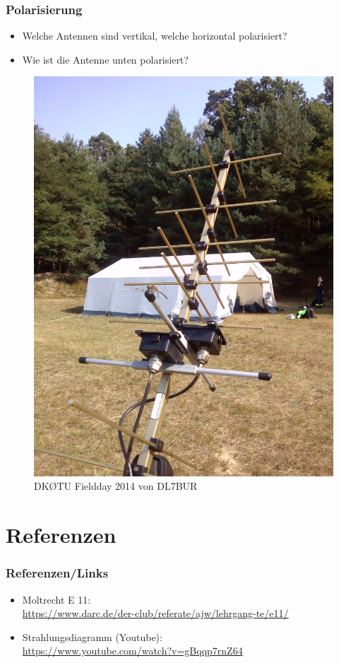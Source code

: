 \begin{frame}
  \frametitle{Polarisierung}
  \begin{itemize}
    \item Welche Antennen sind vertikal, welche horizontal polarisiert?
    \item Wie ist die Antenne unten polarisiert?
  \end{itemize}
  \begin{center}
    \begin{figure}
      \includegraphics[width=.3\textwidth,height=.75\textheight,keepaspectratio]{e11/kreutzYagi.jpg}
      \caption{DK\O TU Fieldday 2014 von DL7BUR}
    \end{figure}
  \end{center}
\end{frame}




\section*{Referenzen}

\begin{frame}
  \frametitle{Referenzen/Links}

  \footnotesize
  \begin{itemize}
    \item Moltrecht E 11: \\
      \url{https://www.darc.de/der-club/referate/ajw/lehrgang-te/e11/}
    \item Strahlungsdiagramm (Youtube): \\
      \url{https://www.youtube.com/watch?v=gBqqp7rnZ64}
  \end{itemize}

\end{frame}



